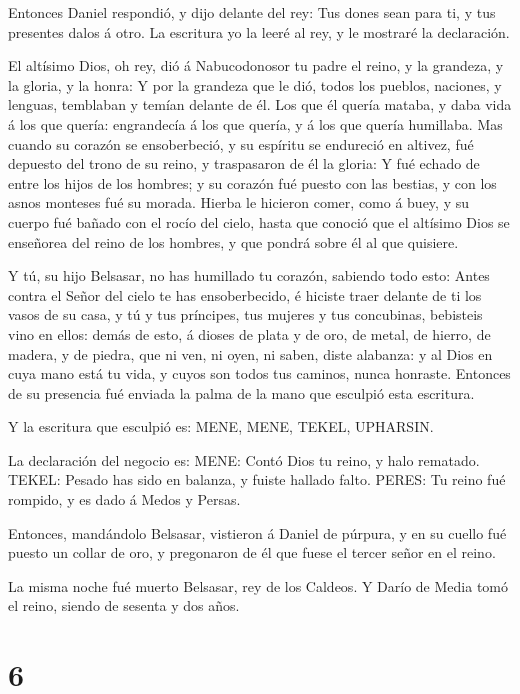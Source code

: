  Entonces Daniel respondió, y dijo delante del rey: Tus
dones sean para ti, y tus presentes dalos á otro. La escritura yo la
leeré al rey, y le mostraré la declaración.

 El altísimo Dios, oh rey, dió á Nabucodonosor tu padre el
reino, y la grandeza, y la gloria, y la honra:  Y por la
grandeza que le dió, todos los pueblos, naciones, y lenguas, temblaban y
temían delante de él. Los que él quería mataba, y daba vida á los que
quería: engrandecía á los que quería, y á los que quería humillaba.
 Mas cuando su corazón se ensoberbeció, y su espíritu se
endureció en altivez, fué depuesto del trono de su reino, y traspasaron
de él la gloria:  Y fué echado de entre los hijos de los
hombres; y su corazón fué puesto con las bestias, y con los asnos
monteses fué su morada. Hierba le hicieron comer, como á buey, y su
cuerpo fué bañado con el rocío del cielo, hasta que conoció que el
altísimo Dios se enseñorea del reino de los hombres, y que pondrá sobre
él al que quisiere.

 Y tú, su hijo Belsasar, no has humillado tu corazón,
sabiendo todo esto:  Antes contra el Señor del cielo te has
ensoberbecido, é hiciste traer delante de ti los vasos de su casa, y tú
y tus príncipes, tus mujeres y tus concubinas, bebisteis vino en ellos:
demás de esto, á dioses de plata y de oro, de metal, de hierro, de
madera, y de piedra, que ni ven, ni oyen, ni saben, diste alabanza: y al
Dios en cuya mano está tu vida, y cuyos son todos tus caminos, nunca
honraste.  Entonces de su presencia fué enviada la palma de
la mano que esculpió esta escritura.

 Y la escritura que esculpió es: MENE, MENE, TEKEL,
UPHARSIN.

 La declaración del negocio es: MENE: Contó Dios tu reino,
y halo rematado.  TEKEL: Pesado has sido en balanza, y
fuiste hallado falto.  PERES: Tu reino fué rompido, y es
dado á Medos y Persas.

 Entonces, mandándolo Belsasar, vistieron á Daniel de
púrpura, y en su cuello fué puesto un collar de oro, y pregonaron de él
que fuese el tercer señor en el reino.

 La misma noche fué muerto Belsasar, rey de los Caldeos.
 Y Darío de Media tomó el reino, siendo de sesenta y dos
años.

\hypertarget{section-5}{%
\section{6}\label{section-5}}

